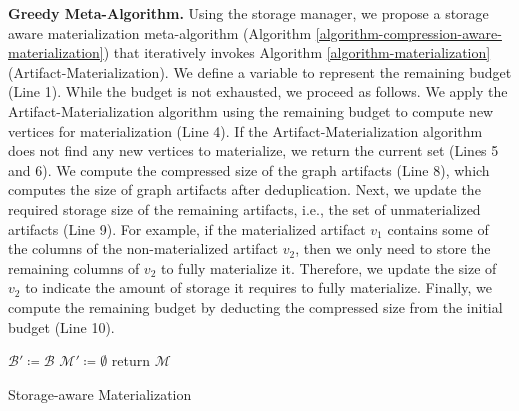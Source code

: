 \textbf{Greedy Meta-Algorithm.}
Using the storage manager, we propose a storage aware materialization meta-algorithm (Algorithm \ref{algorithm-compression-aware-materialization}) that iteratively invokes Algorithm \ref{algorithm-materialization} (Artifact-Materialization).
We define a variable to represent the remaining budget (Line 1).
While the budget is not exhausted, we proceed as follows.
We apply the Artifact-Materialization algorithm using the remaining budget to compute new vertices for materialization (Line 4).
If the Artifact-Materialization algorithm does not find any new vertices to materialize, we return the current set (Lines 5 and 6).
We compute the compressed size of the graph artifacts (Line 8), which computes the size of graph artifacts after deduplication. 
Next, we update the required storage size of the remaining artifacts, i.e., the set of unmaterialized artifacts (Line 9).
For example, if the materialized artifact $v_1$ contains some of the columns of the non-materialized artifact $v_2$, then we only need to store the remaining columns of $v_2$ to fully materialize it.
Therefore, we update the size of $v_2$ to indicate the amount of storage it requires to fully materialize.
Finally, we compute the remaining budget by deducting the compressed size from the initial budget (Line 10).
\begin{algorithm}[h]
$ \mathcal{B}' \coloneqq  \mathcal{B}$ \;
$\mathcal{M'}  \coloneqq \emptyset$\;
return $\mathcal{M}$\;
\caption{Storage-aware Materialization}\label{algorithm-compression-aware-materialization}
\end{algorithm}

